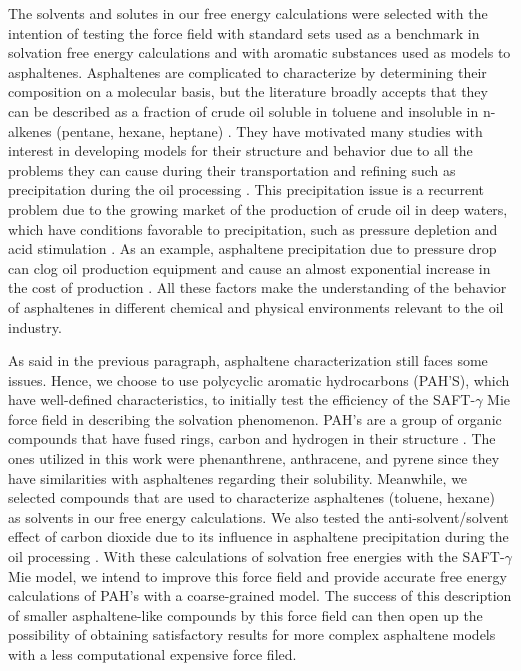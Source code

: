 The solvents and solutes in our free energy calculations were selected with the intention of testing the force field with standard sets used as a benchmark in solvation free energy calculations and with aromatic substances used as models to asphaltenes. Asphaltenes are complicated to characterize by determining their composition on a molecular basis, but the literature broadly accepts that they can be described as a fraction of crude oil soluble in toluene and insoluble in n-alkenes (pentane, hexane, heptane) \cite{SJOBLOM2003399}. They have motivated many studies with interest in developing models for their structure and behavior due to all the problems they can cause during their transportation and refining such as precipitation during the oil processing \cite{SJOBLOM20151}. This precipitation issue is a recurrent problem due to the growing market of the production of crude oil in deep waters, which have conditions favorable to precipitation, such as pressure depletion and acid stimulation \cite{AIC:AIC10243}. As an example, asphaltene precipitation due to pressure drop can clog oil production equipment and cause an almost exponential increase in the cost of production \cite{doi:10.1021/ef010047l}. All these factors make the understanding of the behavior of asphaltenes in different chemical and physical environments relevant to the oil industry. 

As said in the previous paragraph, asphaltene characterization still faces some issues. Hence, we choose to use polycyclic aromatic hydrocarbons (PAH'S), which have well-defined characteristics, to initially test the efficiency of the SAFT-$\gamma$ Mie force field in describing the solvation phenomenon. PAH's are a group of organic compounds that have fused rings, carbon and hydrogen in their structure \cite{RAVINDRA20082895}. The ones utilized in this work were phenanthrene, anthracene, and pyrene since they have similarities with asphaltenes regarding their solubility. Meanwhile,  we selected compounds that are used to characterize asphaltenes (toluene, hexane) as solvents in our free energy calculations. We also tested the anti-solvent/solvent effect of carbon dioxide due to its influence in asphaltene precipitation during the oil processing \cite{SOROUSH2014405}. With these calculations of solvation free energies with the SAFT-$\gamma$ Mie model, we intend to improve this force field and provide accurate free energy calculations of PAH's with a coarse-grained model. The success of this description of smaller asphaltene-like compounds by this force field can then open up the possibility of obtaining satisfactory results for more complex asphaltene models with a less computational expensive force filed.

